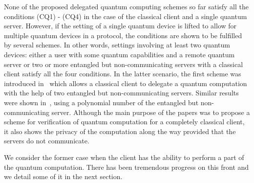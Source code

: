 None of the proposed delegated quantum computing schemes so far satisfy all the conditions (CQ1) - (CQ4) in the case of the classical client and a single quantum server. However, if the setting of a single quantum device is lifted to allow for multiple quantum devices in a protocol, the conditions are shown to be fulfilled by several schemes. In other words, settings involving at least two quantum devices: either a user with some quantum capabilities and a remote quantum server or two or more entangled but non-communicating servers with a classical client satisfy all the four conditions. In the latter scenario, the first scheme was introduced in~\cite{reichardt2013classical} which allows a classical client to delegate a quantum computation with the help of two entangled but non-communicating servers. Similar results were shown in~\cite{mckague2013interactive}, using a polynomial number of the entangled but non-communicating server. Although the main purpose of the papers was to propose a scheme for verification of quantum computation for a completely classical client, it also shows the privacy of the computation along the way provided that the servers do not communicate.
 
We consider the former case when the client has the ability to perform a part of the quantum computation.  There has been tremendous progress on this front and we detail some of it in the next section.

